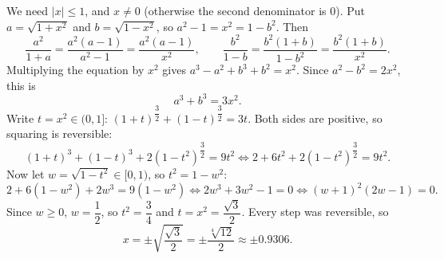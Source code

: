 We need $|x|\le1$, and $x\ne0$ (otherwise the second denominator is $0$). Put $a=\sqrt{1+x^2}$ and $b=\sqrt{1-x^2}$, so $a^2-1=x^2=1-b^2$. Then
\[
\dfrac{a^2}{1+a}=\dfrac{a^2(a-1)}{a^2-1}=\dfrac{a^2(a-1)}{x^2},\qquad
\dfrac{b^2}{1-b}=\dfrac{b^2(1+b)}{1-b^2}=\dfrac{b^2(1+b)}{x^2}.
\]
Multiplying the equation by $x^2$ gives $a^3-a^2+b^3+b^2=x^2$. Since $a^2-b^2=2x^2$, this is
\[
a^3+b^3=3x^2 .
\]
Write $t=x^2\in(0,1]$: $(1+t)^{\dfrac{3}{2}}+(1-t)^{\dfrac{3}{2}}=3t$. Both sides are positive, so squaring is reversible:
\[
(1+t)^3+(1-t)^3+2(1-t^2)^{\dfrac{3}{2}}=9t^2\iff 2+6t^2+2(1-t^2)^{\dfrac{3}{2}}=9t^2 .
\]
Now let $w=\sqrt{1-t^2}\in[0,1)$, so $t^2=1-w^2$:
\[
2+6(1-w^2)+2w^3=9(1-w^2)\iff 2w^3+3w^2-1=0\iff(w+1)^2(2w-1)=0 .
\]
Since $w\ge0$, $w=\dfrac{1}{2}$, so $t^2=\dfrac{3}{4}$ and $t=x^2=\dfrac{\sqrt3}{2}$. Every step was reversible, so
\[
\boxed{x=\pm\sqrt{\dfrac{\sqrt3}{2}}=\pm\dfrac{\sqrt[4]{12}}{2}\approx\pm0.9306}.
\]
